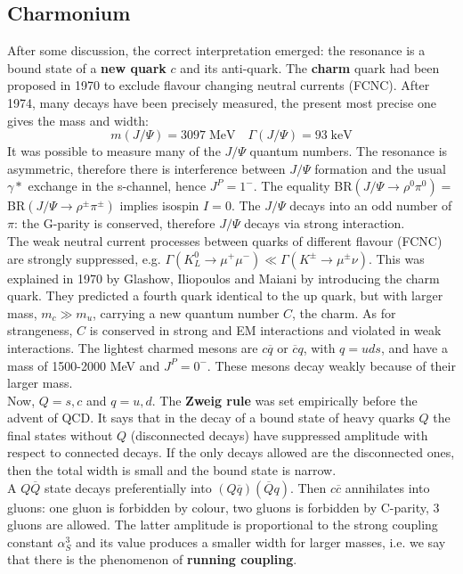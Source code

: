 \documentclass[10.75pt,a4paper,openright,bottom=2cm]{article}
\begin{document}
\subsection{Charmonium}
After some discussion, the correct interpretation emerged: the resonance is a bound state of a \textbf{new quark} $c$ and its anti-quark. The \textbf{charm} quark had been proposed in 1970 to exclude flavour changing neutral currents (FCNC). After 1974, many decays have been precisely measured, the present most precise one gives the mass and width:
\[
m(J/\Psi)=3097\;\text{MeV} \quad \Gamma(J/\Psi)=93\;\text{keV}
\]
It was possible to measure many of the $J/\Psi$ quantum numbers. The resonance is asymmetric, therefore there is interference between $J/\Psi$ formation and the usual $\gamma*$ exchange in the s-channel, hence $J^P=1^-$. The equality BR$(J/\Psi\to\rho^0\pi^0)=$BR$(J/\Psi\to\rho^\pm\pi^\pm)$ implies isospin $I=0$. The $J/\Psi$ decays into an odd number of $\pi$: the G-parity is conserved, therefore $J/\Psi$ decays via strong interaction.\\
The weak neutral current processes between quarks of different flavour (FCNC) are strongly suppressed, e.g. $\Gamma(K_L^0\to\mu^+\mu^-)\ll\Gamma(K^\pm\to\mu^\pm\nu)$. This was explained in 1970 by Glashow, Iliopoulos and Maiani by introducing the charm quark. They predicted a fourth quark identical to the up quark, but with larger mass, $m_c\gg m_u$, carrying a new quantum number $C$, the charm. As for strangeness, $C$ is conserved in strong and EM interactions and violated in weak interactions. The lightest charmed mesons are $c\overline{q}$ or $\overline{c}q$, with $q=uds$, and have a mass of 1500-2000 MeV and $J^P=0^-$. These mesons decay weakly because of their larger mass.\\
Now, $Q=s,c$ and $q=u,d$. The \textbf{Zweig rule} was set empirically before the advent of QCD. It says that in the decay of a bound state of heavy quarks $Q$ the final states without $Q$ (disconnected decays) have suppressed amplitude with respect to connected decays. If the only decays allowed are the disconnected ones, then the total width is small and the bound state is narrow.\\
A $Q\overline{Q}$ state decays preferentially into $(Q\overline{q})(\overline{Q}q)$. Then $c\overline{c}$ annihilates into gluons: one gluon is forbidden by colour, two gluons is forbidden by C-parity, 3 gluons are allowed. The latter amplitude is proportional to the strong coupling constant $\alpha_S^3$ and its value produces a smaller width for larger masses, i.e. we say that there is the phenomenon of \textbf{running coupling}.\\
\end{document}
